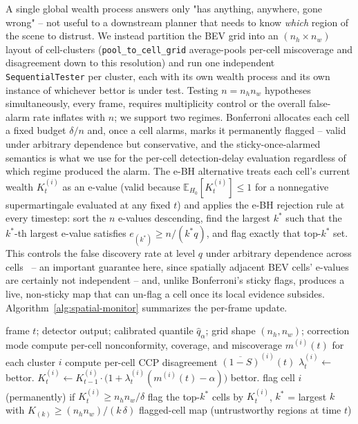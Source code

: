 A single global wealth process answers only "has anything, anywhere, gone wrong" -- not useful to a downstream planner that needs to know \emph{which} region of the scene to distrust. We instead partition the BEV grid into an $(n_h \times n_w)$ layout of cell-clusters (\texttt{pool\_to\_cell\_grid} average-pools per-cell miscoverage and disagreement down to this resolution) and run one independent \texttt{SequentialTester} per cluster, each with its own wealth process and its own instance of whichever bettor is under test. Testing $n = n_h n_w$ hypotheses simultaneously, every frame, requires multiplicity control or the overall false-alarm rate inflates with $n$; we support two regimes. Bonferroni allocates each cell a fixed budget $\delta/n$ and, once a cell alarms, marks it permanently flagged -- valid under arbitrary dependence but conservative, and the sticky-once-alarmed semantics is what we use for the per-cell detection-delay evaluation regardless of which regime produced the alarm. The e-BH alternative treats each cell's current wealth $K_t^{(i)}$ as an e-value (valid because $\mathbb{E}_{H_0}[K_t^{(i)}] \le 1$ for a nonnegative supermartingale evaluated at any fixed $t$) and applies the e-BH rejection rule at every timestep: sort the $n$ e-values descending, find the largest $k^\ast$ such that the $k^\ast$-th largest e-value satisfies $e_{(k^\ast)} \ge n/(k^\ast q)$, and flag exactly that top-$k^\ast$ set. This controls the false discovery rate at level $q$ under arbitrary dependence across cells~\cite{WangRamdas2022JRSSB} -- an important guarantee here, since spatially adjacent BEV cells' e-values are certainly not independent -- and, unlike Bonferroni's sticky flags, produces a live, non-sticky map that can un-flag a cell once its local evidence subsides. Algorithm~\ref{alg:spatial-monitor} summarizes the per-frame update.

\begin{algorithm}[t]
\caption{Per-frame spatial monitoring update}
\label{alg:spatial-monitor}
\footnotesize
\begin{algorithmic}[1]
\Require frame $t$; detector output; calibrated quantile $\hat{q}_\alpha$; grid shape $(n_h, n_w)$; correction mode
\State compute per-cell nonconformity, coverage, and miscoverage $m^{(i)}(t)$ for each cluster $i$
\State compute per-cell CCP disagreement $\overline{(1-S)}^{(i)}(t)$
    \State $\lambda_t^{(i)} \gets$ bettor.
    \State $K_t^{(i)} \gets K_{t-1}^{(i)} \cdot \big(1 + \lambda_t^{(i)}(m^{(i)}(t) - \alpha)\big)$
    \State bettor.
\EndFor
{}
    \State flag cell $i$ (permanently) if $K_t^{(i)} \ge n_h n_w / \delta$
\Else {}
    \State flag the top-$k^\ast$ cells by $K_t^{(i)}$, $k^\ast$ = largest $k$ with $K_{(k)} \ge (n_h n_w) / (k\,\delta)$
\EndIf
\State \Return flagged-cell map (untrustworthy regions at time $t$)
\end{algorithmic}
\end{algorithm}
